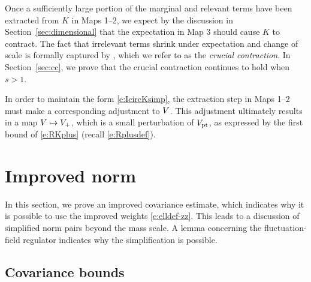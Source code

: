 Once a sufficiently large portion of the marginal and relevant terms have been
extracted from $K$ in Maps 1--2, we expect by the discussion in Section~\ref{sec:dimensional}
that the expectation in Map 3 should cause $K$ to contract. The fact that irrelevant
terms shrink under expectation and change of scale is formally captured by
\cite[Proposition~\ref{IE-prop:cl}]{BS-rg-IE}, which we refer to as the
\emph{crucial contraction}. In Section~\ref{sec:cc}, we prove that the
crucial contraction continues to hold when $s > 1$.

\begin{rk}
In order to maintain the form \eqref{e:IcircKsimp}, the extraction step in Maps 1--2
must make a corresponding adjustment to $V$. This adjustment ultimately results in a
map $V \mapsto V_+$, which is a small perturbation of $V_{\rm pt}$, as expressed
by the first bound of \eqref{e:RKplus} (recall \eqref{e:Rplusdef}).
\end{rk}


\section{Improved norm}
\label{sec:Rpf1}

In this section, we prove an improved covariance estimate, which indicates why
it is possible to use the improved weights \eqref{e:elldef-zz}. This leads to a
discussion of simplified norm pairs beyond the mass scale. A lemma concerning the
fluctuation-field regulator indicates why the simplification is possible.


\subsection{Covariance bounds}
\label{sec:Cbds}

